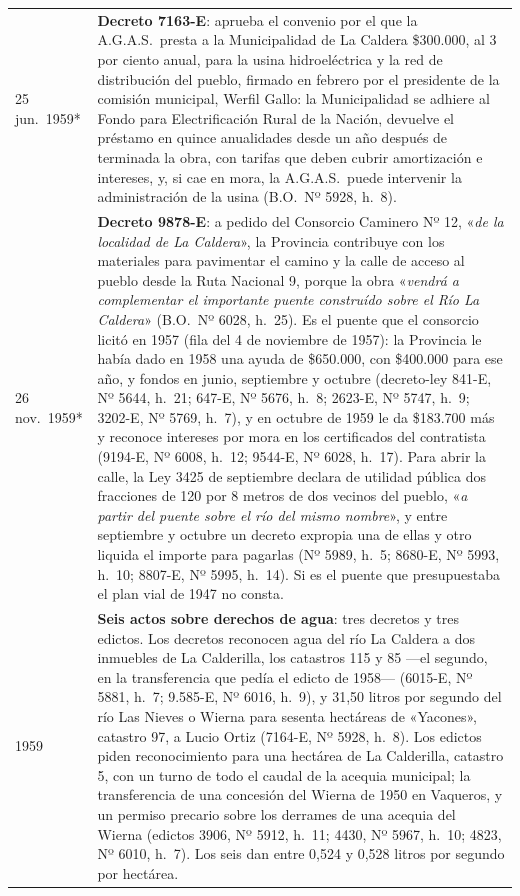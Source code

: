 \begin{longtable}{@{}p{2.7cm}p{10.3cm}@{}}
25 jun.\ 1959* & \textbf{Decreto 7163-E}: aprueba el convenio por el que la A.G.A.S.\ presta a la Municipalidad de La Caldera \$300.000, al 3 por ciento anual, para la usina hidroeléctrica y la red de distribución del pueblo, firmado en febrero por el presidente de la comisión municipal, Werfil Gallo: la Municipalidad se adhiere al Fondo para Electrificación Rural de la Nación, devuelve el préstamo en quince anualidades desde un año después de terminada la obra, con tarifas que deben cubrir amortización e intereses, y, si cae en mora, la A.G.A.S.\ puede intervenir la administración de la usina (B.O.\ Nº 5928, h.\ 8). \\
26 nov.\ 1959* & \textbf{Decreto 9878-E}: a pedido del Consorcio Caminero Nº 12, «\textit{de la localidad de La Caldera}», la Provincia contribuye con los materiales para pavimentar el camino y la calle de acceso al pueblo desde la Ruta Nacional 9, porque la obra «\textit{vendrá a complementar el importante puente construído sobre el Río La Caldera}» (B.O.\ Nº 6028, h.\ 25). Es el puente que el consorcio licitó en 1957 (fila del 4 de noviembre de 1957): la Provincia le había dado en 1958 una ayuda de \$650.000, con \$400.000 para ese año, y fondos en junio, septiembre y octubre (decreto-ley 841-E, Nº 5644, h.\ 21; 647-E, Nº 5676, h.\ 8; 2623-E, Nº 5747, h.\ 9; 3202-E, Nº 5769, h.\ 7), y en octubre de 1959 le da \$183.700 más y reconoce intereses por mora en los certificados del contratista (9194-E, Nº 6008, h.\ 12; 9544-E, Nº 6028, h.\ 17). Para abrir la calle, la Ley 3425 de septiembre declara de utilidad pública dos fracciones de 120 por 8 metros de dos vecinos del pueblo, «\textit{a partir del puente sobre el río del mismo nombre}», y entre septiembre y octubre un decreto expropia una de ellas y otro liquida el importe para pagarlas (Nº 5989, h.\ 5; 8680-E, Nº 5993, h.\ 10; 8807-E, Nº 5995, h.\ 14). Si es el puente que presupuestaba el plan vial de 1947 no consta. \\
1959 & \textbf{Seis actos sobre derechos de agua}: tres decretos y tres edictos. Los decretos reconocen agua del río La Caldera a dos inmuebles de La Calderilla, los catastros 115 y 85 ---el segundo, en la transferencia que pedía el edicto de 1958--- (6015-E, Nº 5881, h.\ 7; 9.585-E, Nº 6016, h.\ 9), y 31,50 litros por segundo del río Las Nieves o Wierna para sesenta hectáreas de «Yacones», catastro 97, a Lucio Ortiz (7164-E, Nº 5928, h.\ 8). Los edictos piden reconocimiento para una hectárea de La Calderilla, catastro 5, con un turno de todo el caudal de la acequia municipal; la transferencia de una concesión del Wierna de 1950 en Vaqueros, y un permiso precario sobre los derrames de una acequia del Wierna (edictos 3906, Nº 5912, h.\ 11; 4430, Nº 5967, h.\ 10; 4823, Nº 6010, h.\ 7). Los seis dan entre 0,524 y 0,528 litros por segundo por hectárea. \\

\end{longtable}
